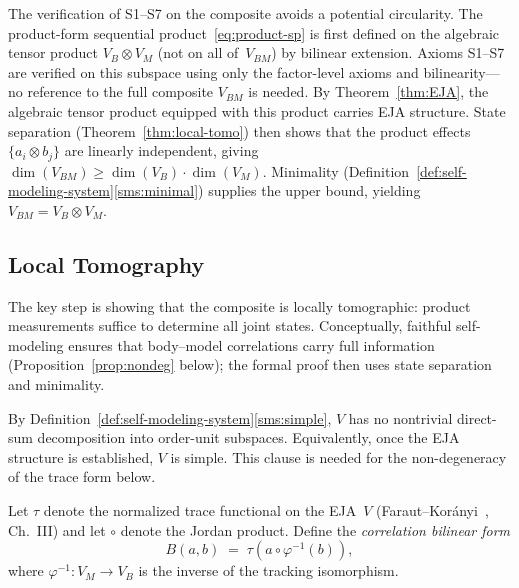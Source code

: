 \begin{remark}\label{rem:bootstrap}
The verification of S1--S7 on the composite avoids a potential
circularity.  The product-form sequential
product~\eqref{eq:product-sp} is first defined on the algebraic
tensor product $V_B \otimes V_M$ (not on all of~$V_{BM}$) by
bilinear extension.  Axioms S1--S7 are verified on this subspace
using only the factor-level axioms and bilinearity---no reference
to the full composite $V_{BM}$ is needed.  By
Theorem~\ref{thm:EJA}, the algebraic tensor product equipped with
this product carries EJA structure.  State separation
(Theorem~\ref{thm:local-tomo}) then shows that the product effects
$\{a_i \otimes b_j\}$ are linearly independent, giving
$\dim(V_{BM}) \ge \dim(V_B) \cdot \dim(V_M)$.  Minimality
(Definition~\ref{def:self-modeling-system}\ref{sms:minimal}) supplies the upper bound,
yielding $V_{BM} = V_B \otimes V_M$.
\end{remark}

\subsection{Local Tomography}\label{subsec:lt-proof}

The key step is showing that the composite is locally tomographic:
product measurements suffice to determine all joint states.
Conceptually, faithful self-modeling ensures that body--model
correlations carry full information (Proposition~\ref{prop:nondeg}
below); the formal proof then uses state separation and minimality.

\noindent
By Definition~\ref{def:self-modeling-system}\ref{sms:simple},
$V$ has no nontrivial direct-sum decomposition into order-unit
subspaces.  Equivalently, once the EJA structure is established, $V$
is simple.  This clause is needed for the non-degeneracy of the
trace form below.%
\label{ass:simple-eja}

\begin{definition}\label{def:corr-form}
Let $\tau$ denote the normalized trace functional on the EJA~$V$
(Faraut--Kor\'anyi~\cite{FarautKoranyi1994}, Ch.~III) and let $\circ$
denote the Jordan product. Define the \emph{correlation bilinear form}
\begin{equation}\label{eq:corr-form}
  B(a,b) \;=\; \tau\!\left(a \circ \varphi^{-1}(b)\right),
\end{equation}
where $\varphi^{-1} \colon V_M \to V_B$ is the inverse of the tracking
isomorphism.
\end{definition}

